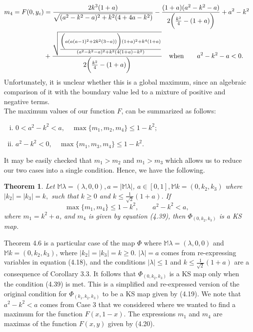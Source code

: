 \documentclass[11pt,reqno]{amsart}
\newtheorem{theorem}[subsection]{Theorem}
\theoremstyle{definition}
\numberwithin{equation}{section} \setcounter{tocdepth}{1}
\def\bm{{\mathbb M}}
\numberwithin{equation}{section}
\begin{document}
 \begin{align}
    m_4=F(0,y_c)&=\frac{2k^3(1+a)}{\sqrt{(a^2-k^2-a)^2+k^2(4+4a-k^2)}}-\frac{(1+a)(a^2-k^2-a)}{2\bigg(\frac{k^2}{4}-(1+a)\bigg)}+a^2-k^2 \notag \\
    &+ \frac{\sqrt{\frac{\bigg(a(a(a-1)^2+2k^2(3-a))\bigg)(1+a)^2+k^4(1+a)}{(a^2-k^2-a)^2+k^2(4(1+a)-k^2)}}}{2\bigg(\frac{k^2}{4}-(1+a)\bigg)} \quad \text{when} \qquad a^2-k^2-a<0.
\end{align}
Unfortunately, it is unclear whether this is a global maximum, since an algebraic comparison of it with the boundary value led to a mixture of positive and negative terms.\\

\noindent The maximum values of our function $F$, can be summarized as follows:
\begin{enumerate}[(i)]
     \item $0<a^2-k^2<a, \quad \max \{m_1,m_2,m_4\} \leq 1-k^2;$
      \item $a^2-k^2<0, \quad \max \{m_1,m_3,m_4\} \leq 1-k^2.$
      \end{enumerate}

It may be easily checked that $m_1>m_2$ and $m_1>m_3$ which allows us to reduce our two cases into a single condition. Hence, we have the following.
\begin{theorem}
    Let $\bm{\lambda}=(\lambda,0,0), a=|\bm{\lambda}|$, $a \in [0,1], \bm{k}=(0,k_2,k_3)$ where $ |k_2|=|k_3|=k,$ such that $ k\geq 0$ and $k \leq \frac{1}{\sqrt{2}}(1+a)$. If \begin{equation}
         \max \{m_1,m_4\} \leq 1-k^2, \qquad  a^2-k^2<a,
    \end{equation}
where $m_1=k^2+a$, and $m_4$ is given by equation (4.39), then $\Phi_{(0,k_2,k_3)}$ is a KS map.

\end{theorem}

Theorem 4.6 is a particular case of the map $\Phi$ where $\bm{\lambda}=(\lambda,0,0)$ and $\bm{k}=(0,k_2,k_3)$, where $|k_2|=|k_3|=k \geq 0$. $|\lambda|=a$ comes from re-expressing variables in equation (4.18), and the conditions $|\lambda|\leq 1$ and $k \leq \frac{1}{\sqrt{2}}(1+a)$ are a consequence of Corollary 3.3. It follows that $\Phi_{(0,k_2,k_3)}$ is a KS map only when the condition (4.39) is met. This is a simplified and re-expressed version of the original condition for $\Phi_{(k_1,k_2,k_3)}$ to be a KS map given by (4.19). We note that $a^2-k^2<a$ comes from Case 3 that we considered where we wanted to find a maximum for the function $F(x,1-x)$. The expressions $m_1$ and $m_4$ are maximas of the function $F(x,y)$ given by (4.20).
\end{document}
